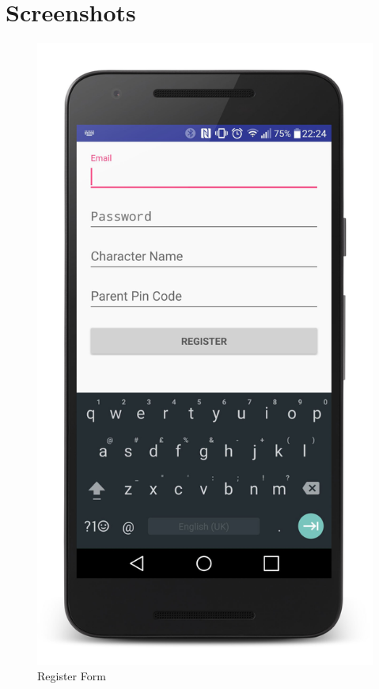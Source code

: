 \chapter{Screenshots}

\begin{figure}[ht] 
  \begin{minipage}[b]{0.45\linewidth}
    \centering
    \includegraphics[width=.6\linewidth]{../images/Screenshot/RegisterPage.jpg} 
    \caption{Register Form} 
    \vspace{4ex}
  \end{minipage}%
  \begin{minipage}[b]{0.45\linewidth}
    \centering

\end{minipage}
\end{figure}
